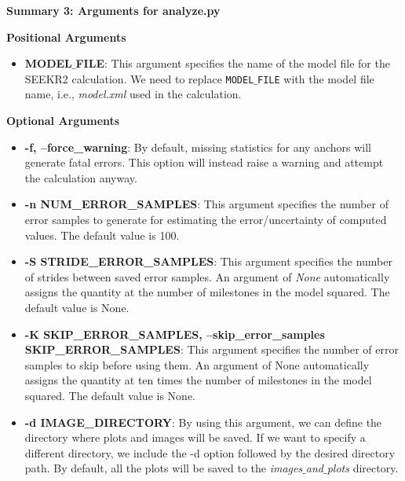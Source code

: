 \documentclass[9pt,training,pubversion]{livecoms}
\begin{document}
\begin{tcolorbox}[colback=black!8!white, colframe=black!50!black, fontlower=\tiny, left=0pt, right=10pt, top=2pt, bottom=2pt]

\textbf{Summary 3: Arguments for analyze.py}

\vspace{2mm}

\noindent \textbf{Positional Arguments} \par
\begin{itemize}

\item \textbf{MODEL$\_$FILE}: This argument specifies the name of the model file for the SEEKR2 calculation. We need to replace \texttt{MODEL$\_$FILE} with the model file name, i.e., \textit{model.xml} used in the calculation.

\end{itemize}

\vspace{2mm}

\noindent \textbf{Optional Arguments} \par

\begin{itemize}

\item \textbf{-f, --force\_warning}: By default, missing statistics for any anchors will generate fatal errors. This option will instead raise a warning and attempt the calculation anyway.

\item \textbf{-n NUM\_ERROR\_SAMPLES}: This argument specifies the number of error samples to generate for estimating the error/uncertainty of computed values. The default value is 100.

\item \textbf{-S STRIDE\_ERROR\_SAMPLES}: This argument specifies the number of strides between saved error samples. An argument of \textit{None} automatically assigns the quantity at the number of milestones in the model squared. The default value is None.

\item \textbf{-K SKIP\_ERROR\_SAMPLES, --skip\_error\_samples SKIP\_ERROR\_SAMPLES}: This argument specifies the number of error samples to skip before using them. An argument of None automatically assigns the quantity at ten times the number of milestones in the model squared. The default value is None.

\item \textbf{-d IMAGE\_DIRECTORY}: By using this argument, we can define the directory where plots and images will be saved. If we want to specify a different directory, we include the -d option followed by the desired directory path. By default, all the plots will be saved to the \textit{images$\_$and$\_$plots} directory. 


\end{itemize}
\end{tcolorbox}
\end{document}
